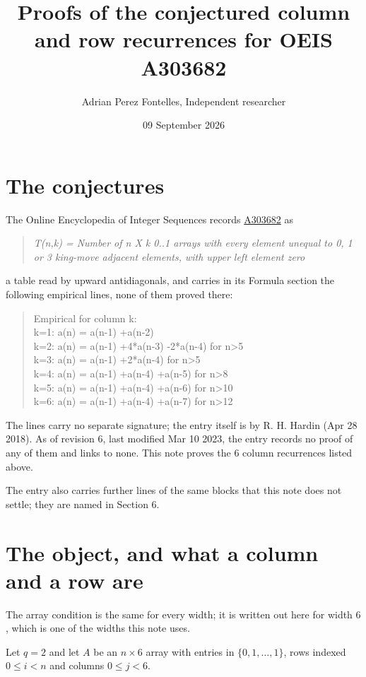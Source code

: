 \documentclass[11pt]{article}
\title{Proofs of the conjectured column and row recurrences for OEIS A303682}
\author{Adrian Perez Fontelles, Independent researcher}
\date{09 September 2026}
\theoremstyle{definition}
\begin{document}
\maketitle
\section{The conjectures}

The Online Encyclopedia of Integer Sequences records \href{https://oeis.org/A303682}{A303682} as

\begin{quote}\itshape T(n,k) = Number of n X k 0..1 arrays with every element unequal to 0, 1 or 3 king-move adjacent elements, with upper left element zero\end{quote}

a table read by upward antidiagonals, and carries in its Formula section the following empirical lines, none of them proved there:

\begin{quote}\ttfamily Empirical for column k:\\
k=1: a(n) = a(n-1) +a(n-2)\\k=2: a(n) = a(n-1) +4*a(n-3) -2*a(n-4) for n>5\\k=3: a(n) = a(n-1) +2*a(n-4) for n>5\\k=4: a(n) = a(n-1) +a(n-4) +a(n-5) for n>8\\k=5: a(n) = a(n-1) +a(n-4) +a(n-6) for n>10\\k=6: a(n) = a(n-1) +a(n-4) +a(n-7) for n>12\end{quote}

The lines carry no separate signature; the entry itself is by R. H. Hardin (Apr 28 2018). As of revision 6, last modified Mar 10 2023, the entry records no proof of any of them and links to none. This note proves the 6 column recurrences listed above.

The entry also carries further lines of the same blocks that this note does not settle; they are named in Section 6.

\section{The object, and what a column and a row are}

The array condition is the same for every width; it is written out here for width $6$, which is one of the widths this note uses.

Let $q = 2$ and let $A$ be an $n \times 6$ array with entries in $\{0,1,\dots,1\}$, rows indexed $0 \le i < n$ and columns $0 \le j < 6$.
\end{document}

